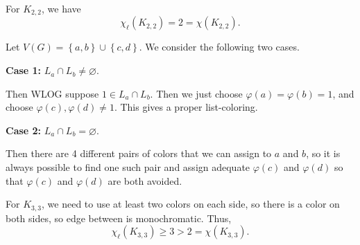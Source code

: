 \begin{eg}
    For \(K_{2, 2}\), we have 
    \[
        \chi _\ell (K_{2, 2}) = 2 = \chi (K_{2, 2}).
    \] 
\end{eg}

\begin{explanation}
    Let \(V(G) = \left\{ a, b \right\} \cup \left\{ c, d \right\}  \). We consider the following two cases. 

    \textbf{Case 1:} \(L_a \cap L_b \neq \varnothing\). 

    Then WLOG suppose \(1 \in L_a \cap L_b\). Then we just choose \(\varphi (a) = \varphi (b) = 1\), and choose \(\varphi (c), \varphi (d) \neq 1\). This gives a proper list-coloring. 

    \textbf{Case 2:} \(L_a \cap L_b = \varnothing \). 

    Then there are 4 different pairs of colors that we can assign to \(a\) and \(b\), so it is always possible to find one such pair and assign adequate \(\varphi (c)\) and \(\varphi (d)\) so that \(\varphi (c)\) and \(\varphi (d)\) are both avoided.              
\end{explanation}

\begin{eg}
    For \(K_{3, 3}\), we need to use at least two colors on each side, so there is a color on both sides, so edge between is monochromatic. Thus,
    \[
        \chi _\ell (K_{3, 3}) \ge 3 > 2 = \chi (K_{3, 3}).
    \] 
    \centering
\end{eg}

